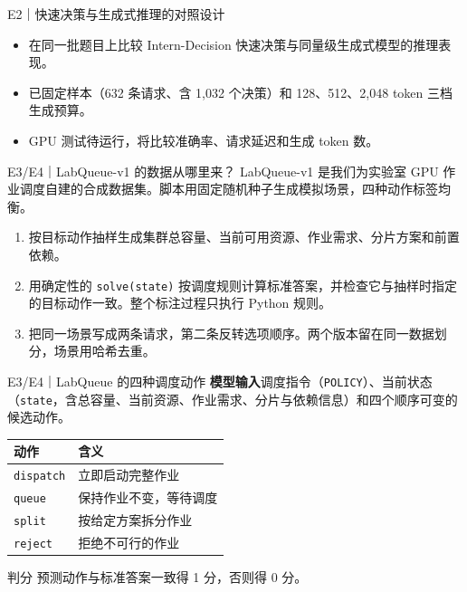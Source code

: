 \documentclass{beamer}
\begin{document}
\begin{frame}{E2｜快速决策与生成式推理的对照设计}
  \small
  \begin{itemize}
    \item 在同一批题目上比较 Intern-Decision 快速决策与同量级生成式模型的推理表现。
    \item 已固定样本（632 条请求、含 1,032 个决策）和 128、512、2,048 token 三档生成预算。
    \item GPU 测试待运行，将比较准确率、请求延迟和生成 token 数。
  \end{itemize}
\end{frame}

\begin{frame}{E3/E4｜LabQueue-v1 的数据从哪里来？}
  \small
  LabQueue-v1 是我们为实验室 GPU 作业调度自建的合成数据集。脚本用固定随机种子生成模拟场景，四种动作标签均衡。

  \medskip
  \begin{enumerate}
    \item 按目标动作抽样生成集群总容量、当前可用资源、作业需求、分片方案和前置依赖。
    \item 用确定性的 \texttt{solve(state)} 按调度规则计算标准答案，并检查它与抽样时指定的目标动作一致。整个标注过程只执行 Python 规则。
    \item 把同一场景写成两条请求，第二条反转选项顺序。两个版本留在同一数据划分，场景用哈希去重。
  \end{enumerate}
\end{frame}

\begin{frame}{E3/E4｜LabQueue 的四种调度动作}
  \small
  \textbf{模型输入}\quad 调度指令（\texttt{POLICY}）、当前状态（\texttt{state}，含总容量、当前资源、作业需求、分片与依赖信息）和四个顺序可变的候选动作。

  \medskip
  \centering
  \begin{tabular}{@{}ll@{}}
    \toprule
    \textbf{动作} & \textbf{含义}\\
    \midrule
    \texttt{dispatch} & 立即启动完整作业\\
    \texttt{queue} & 保持作业不变，等待调度\\
    \texttt{split} & 按给定方案拆分作业\\
    \texttt{reject} & 拒绝不可行的作业\\
    \bottomrule
  \end{tabular}

  \medskip
  \begin{block}{判分}
    预测动作与标准答案一致得 1 分，否则得 0 分。
  \end{block}
\end{frame}
\end{document}
